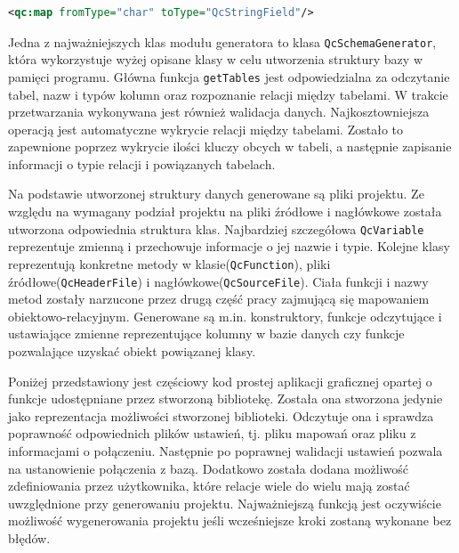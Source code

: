 \documentclass[12pt]{report}
\let\oldaddcontentsline\addcontentsline
\newcommand{\lstinputcplusplus}[2][]{{%
  \renewcommand{\lstlistingname}{C++ Code}%
  \renewcommand{\addcontentsline}[3]{\oldaddcontentsline{loc}{##2}{##3}}%
}}
\begin{document}
\begin{framed}
\begin{lstlisting}[language=XML]
<qc:map fromType="char" toType="QcStringField"/>
\end{lstlisting}
\end{framed}

Jedna z najważniejszych klas modułu generatora to klasa {\tt QcSchemaGenerator}, która  wykorzystuje wyżej opisane klasy w celu utworzenia struktury bazy w pamięci programu. Główna funkcja {\tt getTables} jest odpowiedzialna za odczytanie tabel, nazw i typów kolumn oraz rozpoznanie relacji między tabelami. W trakcie przetwarzania wykonywana jest również walidacja danych. Najkosztowniejsza operacją jest automatyczne wykrycie relacji między tabelami. Zostało to zapewnione poprzez wykrycie ilości kluczy obcych w tabeli, a następnie zapisanie informacji o typie relacji i powiązanych tabelach.

\begin{framed}
\lstinputcplusplus[caption={QcSchemaGenerator}]{additional/qcschemagenerator.cpp}
\end{framed}

Na podstawie utworzonej struktury danych generowane są pliki projektu. Ze względu na wymagany podział projektu na pliki źródłowe i nagłówkowe została utworzona odpowiednia struktura klas. Najbardziej szczegółowa {\tt QcVariable} reprezentuje zmienną i przechowuje informacje o jej nazwie i typie. Kolejne klasy reprezentują konkretne metody w klasie({\tt QcFunction}), pliki źródłowe({\tt QcHeaderFile}) i nagłówkowe({\tt QcSourceFile}). Ciała funkcji i nazwy metod zostały narzucone przez drugą część pracy zajmującą się mapowaniem obiektowo-relacyjnym. Generowane są m.in. konstruktory, funkcje odczytujące i ustawiające zmienne reprezentujące kolumny w bazie danych czy funkcje pozwalające uzyskać obiekt powiązanej klasy.

\begin{framed}
\lstinputcplusplus[caption={QcFileGenerator}]{additional/qcfilegenerator.h}
\end{framed}

Poniżej przedstawiony jest częściowy kod prostej aplikacji graficznej opartej o funkcje udostępniane przez stworzoną bibliotekę. Została ona stworzona jedynie jako reprezentacja możliwości stworzonej biblioteki. Odczytuje ona i sprawdza poprawność odpowiednich plików ustawień, tj. pliku mapowań oraz pliku z informacjami o połączeniu. Następnie po poprawnej walidacji ustawień pozwala na ustanowienie połączenia z bazą. Dodatkowo została dodana możliwość zdefiniowania przez użytkownika, które relacje wiele do wielu mają zostać uwzględnione przy generowaniu projektu. Najważniejszą funkcją jest oczywiście możliwość wygenerowania projektu jeśli wcześniejsze kroki zostaną wykonane bez błędów.
\end{document}
